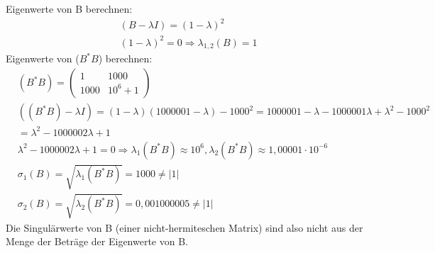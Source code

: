 Eigenwerte von B berechnen:
\begin{align*}
&(B-\lambda I)=(1-\lambda)^2\\
&(1-\lambda)^2=0 \Rightarrow \lambda_{1,2}(B)=1
\end{align*}
Eigenwerte von ($B^*B$) berechnen:
\begin{align*}
&(B^*B)=
\begin{pmatrix}
1 & 1000\\
1000 & 10^6+1
\end{pmatrix}\\
&((B^*B)-\lambda I)=(1-\lambda)(1000001-\lambda)-1000^2=1000001-\lambda-1000001\lambda+\lambda^2-1000^2\\ &=\lambda^2-1000002\lambda+1\\
&\lambda^2-1000002\lambda+1=0 \Rightarrow \lambda_{1}(B^*B)\approx 10^6, \lambda_{2}(B^*B) \approx 1,00001\cdot 10^{-6}\\
&\sigma_1(B)=\sqrt{\lambda_1(B^*B)}=1000 \neq |1|\\
&\sigma_2(B)=\sqrt{\lambda_2(B^*B)}=0,001000005 \neq|1|
\end{align*}
Die Singulärwerte von B (einer nicht-hermiteschen Matrix) sind also nicht aus der Menge der Beträge der Eigenwerte von B.
